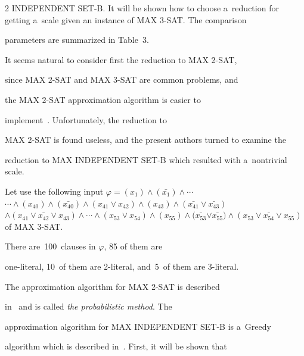 \begin{multicols}{2}
{INDEPENDENT SET-B}. It will be shown how to choose a~reduction for getting a~scale given an instance of {MAX 3-SAT}. The comparison


parameters are summarized in Table~3. %














It seems natural to consider first the reduction to {MAX 2-SAT},


since {MAX 2-SAT} and {MAX 3-SAT} are common problems, and


the {MAX 2-SAT} approximation algorithm is easier to


implement~\cite{link-to-the-sofware-cite}. Unfortunately, the reduction to


{MAX 2-SAT} is found useless, and the present authors turned to examine the


reduction to {MAX INDEPENDENT SET-B} which resulted with a~nontrivial scale.





Let use the following input $\varphi = (x_1)\wedge (\bar{x_1})\wedge


\cdots $\linebreak $\cdots\wedge(x_{40})\wedge (\bar{x_{40}})\wedge(x_{41}\vee


x_{42})\wedge(x_{43})\wedge(\bar{x_{41}}\vee


\bar{x_{43}})$\linebreak $\wedge(x_{41}\vee \bar{x_{42}} \vee x_{43})\wedge \cdots


\wedge (x_{53}\vee x_{54})\wedge(x_{55})\wedge(\bar{x_{53}}$\linebreak $\vee


\bar{x_{55}})\wedge(x_{53}\vee \bar{x_{54}} \vee x_{55})$ of {MAX 3-SAT}.


There are~100~clauses in $\varphi$, 85 of them are


one-literal, 10~of them are 2-literal, and~5~of them are 3-literal.


The approximation algorithm for MAX 2-SAT is described


in~\cite{Y1994} and is called \textit{the probabilistic method}. The


approximation algorithm for {MAX INDEPENDENT SET-B} is a~Greedy


algorithm which is described in~\cite{HR1994}. First,  it will be shown that



\end{multicols}
